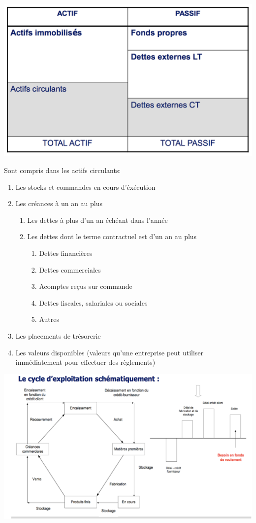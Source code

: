 \documentclass{article}
\begin{document}
\includegraphics[width=15cm]{c1.png}

Sont compris dans les actifs circulants:
\begin{enumerate}
	\item Les stocks et commandes en cours d'éxécution
	\item Les créances à un an au plus
	\begin{enumerate}
		\item Les dettes à plus d'un an échéant dans l'année
		\item Les dettes dont le terme contractuel est d'un an au plus
		\begin{enumerate}
			\item Dettes financières
			\item Dettes commerciales
			\item Acomptes reçus sur commande
			\item Dettes fiscales, salariales ou sociales
			\item Autres
		\end{enumerate}
	\end{enumerate}
	\item Les placements de trésorerie
	\item Les valeurs disponibles (valeurs qu'une entreprise peut utiliser immédiatement pour effectuer des règlements)
\end{enumerate}

\includegraphics[width=15 cm]{c4.png}
\end{document}
